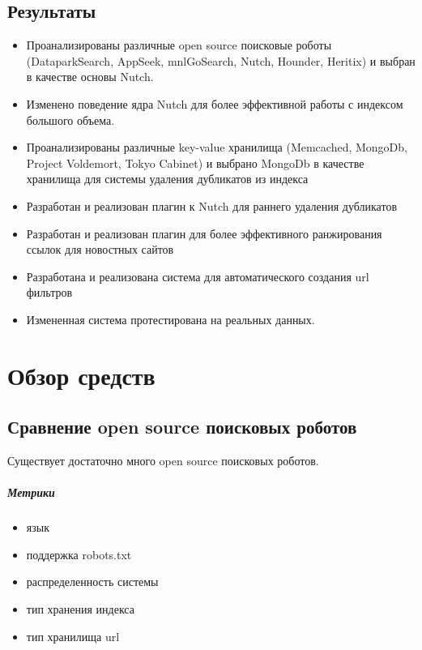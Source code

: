 \section{Результаты}
\begin{itemize}
 \item Проанализированы различные open source поисковые роботы (DataparkSearch, AppSeek, mnlGoSearch, Nutch, Hounder, Heritix) и выбран в качестве основы Nutch.
 \item Изменено поведение ядра Nutch для более эффективной работы с индексом большого объема.
 \item Проанализированы различные key-value хранилища (Memcached, MongoDb, Project Voldemort, Tokyo Cabinet) и выбрано MongoDb в качестве хранилища для системы удаления дубликатов из индекса
 \item Разработан и реализован плагин к Nutch для раннего удаления дубликатов
 \item Разработан и реализован плагин для более эффективного ранжирования ссылок для новостных сайтов
 \item Разработана и реализована система для автоматического создания url фильтров
 \item Измененная система протестирована на реальных данных.
\end{itemize}

\chapter{Обзор средств}
\section{Сравнение open source поисковых роботов}
Существует достаточно много open source поисковых роботов.
\paragraph{Метрики}
\begin{itemize}
 \item язык
 \item поддержка robots.txt
 \item распределенность системы
 \item тип хранения индекса
 \item тип хранилища url
\end{itemize}
